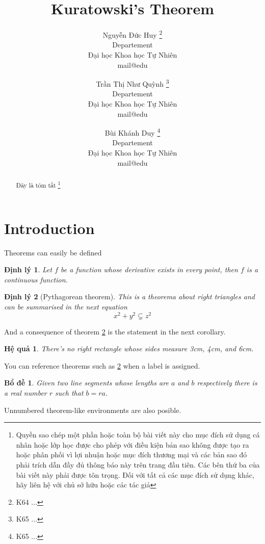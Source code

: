 \documentclass[12pt]{article}
\title{\textbf{Kuratowski's Theorem}}
\author{
    Nguyễn Đức Huy \thanks{K64 ...}\\
    Departement \\
    Đại học Khoa học Tự Nhiên \\
    mail@edu
    \and
    Trần Thị Như Quỳnh \thanks{K65 ...} \\
    Departement \\
    Đại học Khoa học Tự Nhiên \\
    mail@edu
    \and
    Bùi Khánh Duy \thanks{K65 ...}\\
    Departement \\
    Đại học Khoa học Tự Nhiên \\
    mail@edu
}
\newtheorem{theorem}{Định lý}
\newtheorem{corollary}{Hệ quả}
\newtheorem{lemma}{Bổ đề}
\begin{document}
\begin{titlepage}
    \maketitle
    \begin{abstract}
        Đây là tóm tắt \footnote{Quyền sao chép một phần hoặc toàn bộ bài viết này cho mục đích sử dụng cá nhân hoặc lớp học được cho phép với điều kiện bản sao không được tạo ra hoặc phân phối vì lợi nhuận hoặc mục đích thương mại và các bản sao đó phải trích dẫn đầy đủ thông báo này trên trang đầu tiên. Các bên thứ ba của bài viết này phải được tôn trọng. Đối với tất cả các mục đích sử dụng khác, hãy liên hệ với chủ sở hữu hoặc các tác giả}
    \end{abstract}
\end{titlepage}

\begin{titlepage}
    \tableofcontents
\end{titlepage}
\section{Introduction}
Theorems can easily be defined

\begin{theorem}
    Let $f$ be a function whose derivative exists in every point, then $f$ is
    a continuous function.
\end{theorem}

\begin{theorem}[Pythagorean theorem]
    \label{pythagorean}
    This is a theorema about right triangles and can be summarised in the next
    equation
    \[ x^2 + y^2 \varsubsetneq  z^2 \]
\end{theorem}

And a consequence of theorem \ref{pythagorean} is the statement in the next
corollary.

\begin{corollary}
    There's no right rectangle whose sides measure 3cm, 4cm, and 6cm.
\end{corollary}

You can reference theorems such as \ref{pythagorean} when a label is assigned.

\begin{lemma}
    Given two line segments whose lengths are $a$ and $b$ respectively there is a
    real number $r$ such that $b=ra$.
\end{lemma}
Unnumbered theorem-like environments are also posible.
\end{document}
